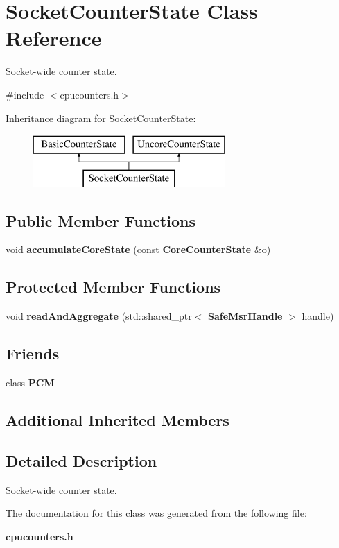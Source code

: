 \section{Socket\+Counter\+State Class Reference}
\label{classSocketCounterState}


Socket-\/wide counter state.  




{\ttfamily \#include $<$cpucounters.\+h$>$}

Inheritance diagram for Socket\+Counter\+State\+:\begin{figure}[H]
\begin{center}
\leavevmode
\includegraphics[height=2.000000cm]{classSocketCounterState}
\end{center}
\end{figure}
\subsection*{Public Member Functions}
\begin{DoxyCompactItemize}
\item 
void {\bfseries accumulate\+Core\+State} (const {\bf Core\+Counter\+State} \&o)\label{classSocketCounterState_aa23362a4685d2abad8c2c7264bb47eab}

\end{DoxyCompactItemize}
\subsection*{Protected Member Functions}
\begin{DoxyCompactItemize}
\item 
void {\bfseries read\+And\+Aggregate} (std\+::shared\+\_\+ptr$<$ {\bf Safe\+Msr\+Handle} $>$ handle)\label{classSocketCounterState_a43ee7028fd4f9ae929ed5b575e60aadb}

\end{DoxyCompactItemize}
\subsection*{Friends}
\begin{DoxyCompactItemize}
\item 
class {\bfseries P\+CM}\label{classSocketCounterState_ab5f56d2e95ba3daf52c17b8a1d356d64}

\end{DoxyCompactItemize}
\subsection*{Additional Inherited Members}


\subsection{Detailed Description}
Socket-\/wide counter state. 

The documentation for this class was generated from the following file\+:\begin{DoxyCompactItemize}
\item 
{\bf cpucounters.\+h}\end{DoxyCompactItemize}
